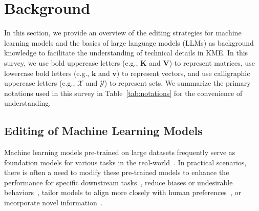 \documentclass[acmsmall, screen]{acmart}
\begin{document}
\vspace{-.02in}
\section{Background}
\label{sec:background}

In this section, we provide an overview of the editing strategies for machine learning models and the basics of large language models (LLMs) as background knowledge to facilitate the understanding of technical details in KME. In this survey, we use bold uppercase letters (e.g., $\mathbf{K}$ and $\mathbf{V}$) to represent matrices, use lowercase bold letters (e.g., $\mathbf{k}$ and $\mathbf{v}$) to represent vectors, and use calligraphic uppercase letters (e.g., $\mathcal{X}$ and $\mathcal{Y}$) to represent sets. We summarize the primary notations used in this survey in Table~\ref{tab:notations} for the convenience of understanding.

\vspace{-.02in}
\subsection{Editing of Machine Learning Models}

Machine learning models \cite{he2016deep, gemmeke2017audio, kenton2019bert} pre-trained on large datasets frequently serve as foundation models for various tasks in the real-world~\cite{deng2009imagenet,schuhmann2021laion}. In practical scenarios, there is often a need to modify these pre-trained models to enhance the performance for specific downstream tasks~\cite{zhuang2020comprehensive, wortsman2022robust, muennighoff2022crosslingual, chung2022scaling, chiang2023can}, reduce biases or undesirable behaviors~\cite{ribeiro2022adaptive, ganguli2022red, perez2022red, Patch}, tailor models to align more closely with human preferences~\cite{glaese2022improving, kasirzadeh2023conversation, liu2023chain}, or incorporate novel information~\cite{zhu2020modifying, mitchell2022fast,yao2023editing}. 
\end{document}

